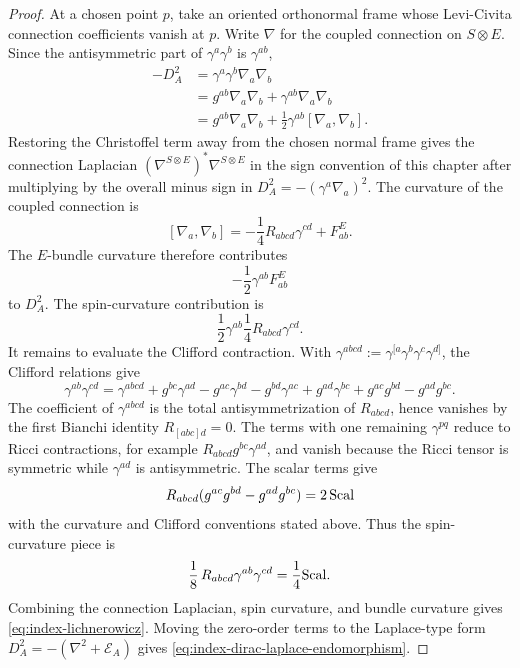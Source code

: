 \begin{proof}
At a chosen point \(p\), take an oriented orthonormal frame whose Levi-Civita
connection coefficients vanish at \(p\).  Write \(\nabla\) for the coupled
connection on \(S\otimes E\).  Since the antisymmetric part of
\(\gamma^a\gamma^b\) is \(\gamma^{ab}\),
\[
\begin{aligned}
  -D_A^2
  &=
  \gamma^a\gamma^b\nabla_a\nabla_b                                      \\
  &=
  g^{ab}\nabla_a\nabla_b
  +\gamma^{ab}\nabla_a\nabla_b                                          \\
  &=
  g^{ab}\nabla_a\nabla_b
  +\frac12\gamma^{ab}[\nabla_a,\nabla_b].
\end{aligned}
\]
Restoring the Christoffel term away from the chosen normal frame gives the
connection Laplacian \((\nabla^{S\otimes E})^\ast\nabla^{S\otimes E}\) in the
sign convention of this chapter after multiplying by the overall minus sign
in \(D_A^2=-(\gamma^a\nabla_a)^2\).  The curvature of the coupled connection is
\[
  [\nabla_a,\nabla_b]
  =
  -\frac14R_{ab cd}\gamma^{cd}+F^E_{ab}.
\]
The \(E\)-bundle curvature therefore contributes
\[
  -\frac12\gamma^{ab}F^E_{ab}
\]
to \(D_A^2\).
The spin-curvature contribution is
\[
  \frac12\gamma^{ab}\frac14R_{ab cd}\gamma^{cd}.
\]
It remains to evaluate the Clifford contraction.  With
\(\gamma^{abcd}:=\gamma^{[a}\gamma^b\gamma^c\gamma^{d]}\), the Clifford
relations give
\[
  \gamma^{ab}\gamma^{cd}
  =
  \gamma^{abcd}
  +g^{bc}\gamma^{ad}
  -g^{ac}\gamma^{bd}
  -g^{bd}\gamma^{ac}
  +g^{ad}\gamma^{bc}
  +g^{ac}g^{bd}
  -g^{ad}g^{bc}.
\]
The coefficient of \(\gamma^{abcd}\) is the total antisymmetrization of
\(R_{abcd}\), hence vanishes by the first Bianchi identity
\(R_{[abc]d}=0\).  The terms with one remaining \(\gamma^{pq}\) reduce to
Ricci contractions, for example \(R_{ab cd}g^{bc}\gamma^{ad}\), and vanish
because the Ricci tensor is symmetric while \(\gamma^{ad}\) is antisymmetric.
The scalar terms give
\[
  R_{ab cd}(g^{ac}g^{bd}-g^{ad}g^{bc})
  =
  2\,{\rm Scal}
\]
with the curvature and Clifford conventions stated above.  Thus the
spin-curvature piece is
\[
  \frac18\,R_{ab cd}\gamma^{ab}\gamma^{cd}
  =
  \frac14{\rm Scal}.
\]
Combining the connection Laplacian, spin curvature, and bundle curvature gives
\eqref{eq:index-lichnerowicz}.  Moving the zero-order terms to the
Laplace-type form \(D_A^2=-(\nabla^2+\mathcal E_A)\) gives
\eqref{eq:index-dirac-laplace-endomorphism}.
\end{proof}

